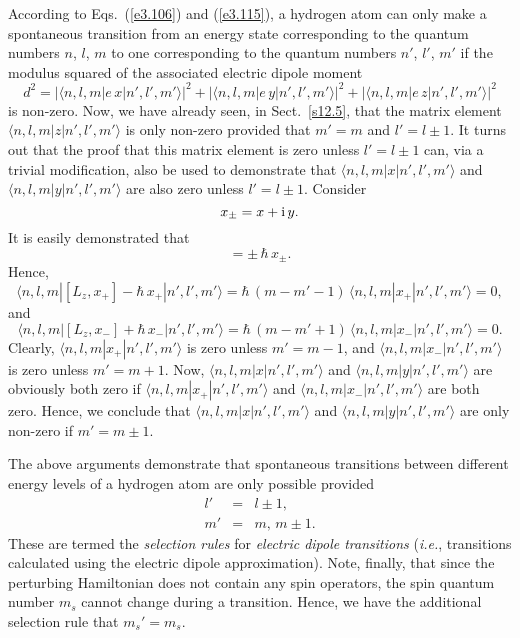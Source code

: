  According to Eqs.~(\ref{e3.106}) and (\ref{e3.115}), a hydrogen
 atom can only make a spontaneous transition from an energy
 state corresponding to the quantum numbers $n$, $l$, $m$ to
 one corresponding to the quantum numbers $n'$, $l'$,  $m'$ if
 the modulus squared of the associated electric dipole moment
 \begin{equation}\label{e13.128}
 d^2 = |\langle n,l,m|e\,x|n',l',m'\rangle|^2 + |\langle n,l,m|e\,y|n',l',m'\rangle|^2
  + |\langle n,l,m|e\,z|n',l',m'\rangle|^2
  \end{equation}
  is non-zero. Now, we have already seen, in Sect.~\ref{s12.5}, that the
  matrix element $\langle n,l,m|z|n',l',m'\rangle$ is only non-zero
  provided that $m'=m$ and $l'=l\pm 1$. It turns out that the proof
  that this matrix element is zero unless $l'=l\pm 1$ can, via a trivial modification, also be used to demonstrate
  that $\langle n,l,m|x|n',l',m'\rangle$ and  $\langle n,l,m|y|n',l',m'\rangle$
  are also zero unless $l'=l\pm 1$. Consider
  \begin{equation}
  x_\pm = x + {\rm i}\, y.
  \end{equation}
  It is easily demonstrated that
  \begin{equation}
  [L_z, x_\pm] = \pm\,\hbar\,x_\pm.
  \end{equation}
  Hence,
  \begin{equation}
  \langle n,l,m|[L_z,x_+]-\hbar\,x_+|n',l',m'\rangle = \hbar\,(m-m'-1)\,
  \langle n,l,m|x_+|n',l',m'\rangle = 0,
  \end{equation}
  and
  \begin{equation}
  \langle n,l,m|[L_z,x_-]+\hbar\,x_-|n',l',m'\rangle = \hbar\,(m-m'+1)\,
  \langle n,l,m|x_-|n',l',m'\rangle = 0.
  \end{equation}
Clearly, $\langle n,l,m|x_+|n',l',m'\rangle$ is zero unless $m'=m-1$,
and $\langle n,l,m|x_-|n',l',m'\rangle$ is zero unless $m'=m+1$. 
Now, $\langle n,l,m|x|n',l',m'\rangle$ and  $\langle n,l,m|y|n',l',m'\rangle$ are
obviously both zero if  $\langle n,l,m|x_+|n',l',m'\rangle$ and $\langle n,l,m|x_-|n',l',m'\rangle$ 
are both zero. Hence, we conclude that $\langle n,l,m|x|n',l',m'\rangle$ and  $\langle n,l,m|y|n',l',m'\rangle$  are only non-zero if $m'=m\pm 1$.

The above arguments demonstrate that spontaneous transitions between different energy levels of a hydrogen atom are only possible provided
\begin{eqnarray}\label{e13.133}
l'&=&l\pm 1,\\[0.5ex]
m' &=& m,\,m\pm 1.\label{e13.134}
\end{eqnarray}
These are termed the {\em selection rules}\/ for {\em electric dipole
transitions} ({\em i.e.}, transitions calculated using the electric
dipole approximation). Note, finally, that since the perturbing Hamiltonian
does not contain any spin operators, the spin quantum number $m_s$
cannot change during a transition. Hence, we have the additional
selection rule that $m_s'=m_s$. 

